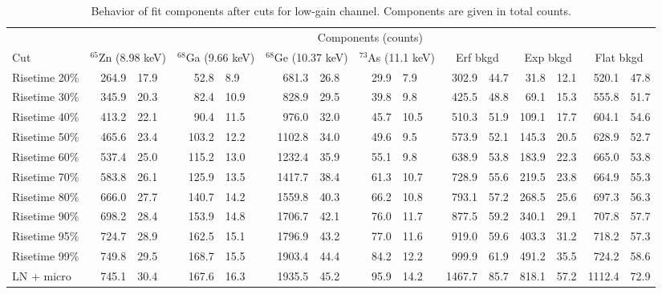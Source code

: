 						\begin{sidewaystable}
							\centering
							\footnotesize
							\begin{tabular}{l  r@{$~\pm~$}l  r@{$~\pm~$}l  r@{$~\pm~$}l  r@{$~\pm~$}l  r@{$~\pm~$}l  r@{$~\pm~$}l  r@{$~\pm~$}l  }
								\toprule 
								& \multicolumn{14}{c}{Components (counts)} \\
								\cmidrule[1pt]{2-14} 
								Cut & \multicolumn{2}{c}{$^{65}$Zn (8.98 keV)} & \multicolumn{2}{c}{$^{68}$Ga (9.66 keV)} & \multicolumn{2}{c}{$^{68}$Ge (10.37 keV)} & \multicolumn{2}{c}{$^{73}$As (11.1 keV)} & \multicolumn{2}{c}{Erf bkgd} & \multicolumn{2}{c}{Exp bkgd} & \multicolumn{2}{c}{Flat bkgd}  \\
								\midrule
							        	 Risetime 20\% & 264.9 & 17.9 & 52.8 & 8.9 & 681.3 & 26.8 & 29.9 & 7.9 & 302.9 & 44.7 & 31.8 & 12.1 & 520.1 & 47.8  \\
									 Risetime 30\% & 345.9 & 20.3 & 82.4 & 10.9 & 828.9 & 29.5 & 39.8 & 9.8 & 425.5 & 48.8 & 69.1 & 15.3 & 555.8 & 51.7  \\
									 Risetime 40\% & 413.2 & 22.1 & 90.4 & 11.5 & 976.0 & 32.0 & 45.7 & 10.5 & 510.3 & 51.9 & 109.1 & 17.7 & 604.1 & 54.6  \\
									 Risetime 50\% & 465.6 & 23.4 & 103.2 & 12.2 & 1102.8 & 34.0 & 49.6 & 9.5 & 573.9 & 52.1 & 145.3 & 20.5 & 628.9 & 52.7  \\
									 Risetime 60\% & 537.4 & 25.0 & 115.2 & 13.0 & 1232.4 & 35.9 & 55.1 & 9.8 & 638.9 & 53.8 & 183.9 & 22.3 & 665.0 & 53.8  \\
									 Risetime 70\% & 583.8 & 26.1 & 125.9 & 13.5 & 1417.7 & 38.4 & 61.3 & 10.7 & 728.9 & 55.6 & 219.5 & 23.8 & 664.9 & 55.3  \\
									 Risetime 80\% & 666.0 & 27.7 & 140.7 & 14.2 & 1559.8 & 40.3 & 66.2 & 10.8 & 793.1 & 57.2 & 268.5 & 25.6 & 697.3 & 56.3  \\
									 Risetime 90\% & 698.2 & 28.4 & 153.9 & 14.8 & 1706.7 & 42.1 & 76.0 & 11.7 & 877.5 & 59.2 & 340.1 & 29.1 & 707.8 & 57.7  \\
									 Risetime 95\% & 724.7 & 28.9 & 162.5 & 15.1 & 1796.9 & 43.2 & 77.0 & 11.6 & 919.0 & 59.6 & 403.3 & 31.2 & 718.2 & 57.3  \\
									 Risetime 99\% & 749.8 & 29.5 & 168.7 & 15.5 & 1903.4 & 44.4 & 84.2 & 12.2 & 999.9 & 61.9 & 491.2 & 35.5 & 724.2 & 58.6  \\
									 LN + micro & 745.1 & 30.4 & 167.6 & 16.3 & 1935.5 & 45.2 & 95.9 & 14.2 & 1467.7 & 85.7 & 818.1 & 57.2 & 1112.4 & 72.9  \\
								 
								\bottomrule
							\end{tabular}

							\caption[Behavior of fit components after cuts for low-gain \bege~channel]
							{Behavior of fit components after cuts for low-gain channel.  Components are given in total counts.}
							\label{tab:RTLowGainResults}
						\end{sidewaystable}						

